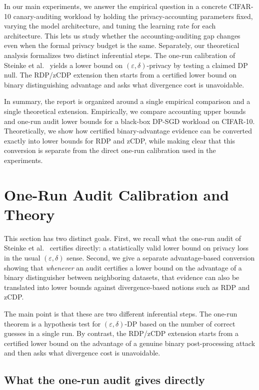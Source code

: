 \documentclass[10pt]{article}
\newcommand{\eps}{\varepsilon}
\newcommand{\del}{\delta}
\begin{document}
In our main experiments, we answer the empirical question in a concrete CIFAR-10 canary-auditing workload by holding the privacy-accounting parameters fixed, varying the model architecture, and tuning the learning rate for each architecture. This lets us study whether the accounting-auditing gap changes even when the formal privacy budget is the same. Separately, our theoretical analysis formalizes two distinct inferential steps. The one-run calibration of Steinke et al.~\cite{steinke2023privacy} yields a lower bound on $(\eps,\delta)$-privacy by testing a claimed DP null. The RDP/zCDP extension then starts from a certified lower bound on binary distinguishing advantage and asks what divergence cost is unavoidable.

In summary, the report is organized around a single empirical comparison and a single theoretical extension. Empirically, we compare accounting upper bounds and one-run audit lower bounds for a black-box DP-SGD workload on CIFAR-10. Theoretically, we show how certified binary-advantage evidence can be converted exactly into lower bounds for RDP and zCDP, while making clear that this conversion is separate from the direct one-run calibration used in the experiments.

\section{One-Run Audit Calibration and Theory}

This section has two distinct goals. First, we recall what the one-run audit of Steinke et al.~\cite{steinke2023privacy} certifies directly: a statistically valid lower bound on privacy loss in the usual $(\eps,\del)$ sense. Second, we give a separate advantage-based conversion showing that \emph{whenever} an audit certifies a lower bound on the advantage of a binary distinguisher between neighboring datasets, that evidence can also be translated into lower bounds against divergence-based notions such as RDP and zCDP.

The main point is that these are two different inferential steps. The one-run theorem is a hypothesis test for $(\eps,\del)$-DP based on the number of correct guesses in a single run. By contrast, the RDP/zCDP extension starts from a certified lower bound on the advantage of a genuine binary post-processing attack and then asks what divergence cost is unavoidable.

\subsection{What the one-run audit gives directly}
\end{document}
